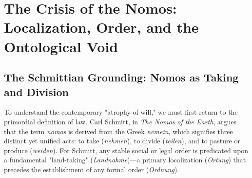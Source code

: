 \documentclass[12pt,a4paper,oneside]{report}
\begin{document}
\begin{abstract}
\noindent
This dissertation interrogates the ontological and political foundations of \textbf{Praxis}, a decentralized protocol for the rectification of the human Will. Moving beyond the descriptive analysis of the platform as a technical tool, we frame it as a rigorous philosophical synthesis of the Platonic \textit{Republic} and Stirnerite radical egoism. We argue that the contemporary "Atrophy of Will" is not a psychological malady but an ontological failure of the subject to navigate the collapse of the \textit{Big Other}. By externalizing the conscience through a dynamic Intention Graph and a symmetric "Transparent Panopticon," Praxis offers a post-ideological resolution for the problem of personal failure. This work further explores the convergence of the Liberal-Left's compassion for the fragile and the Authoritarian-Right's demand for noble struggle, ultimately positing Praxis as a "Digital Monastery" for the teleological resolution of the subject. We conclude by addressing the Levinasian and Heideggerian risks of algorithmic mediation, proposing a "Sovereign Audit" as the final defense of the Unique, and arguing that Praxis represents the transition to the "End of History" through the Eternal Renewal of the Will.
\end{abstract}

\tableofcontents
\listoffigures

\chapter{The Crisis of the Nomos: Localization, Order, and the Ontological Void}

\section{The Schmittian Grounding: Nomos as Taking and Division}
To understand the contemporary "atrophy of will," we must first return to the primordial definition of law. Carl Schmitt, in \textit{The Nomos of the Earth}, argues that the term \textit{nomos} is derived from the Greek \textit{nemein}, which signifies three distinct yet unified acts: to take (\textit{nehmen}), to divide (\textit{teilen}), and to pasture or produce (\textit{weiden}). For Schmitt, any stable social or legal order is predicated upon a fundamental "land-taking" (\textit{Landnahme})—a primary localization (\textit{Ortung}) that precedes the establishment of any formal order (\textit{Ordnung}). 
\end{document}
